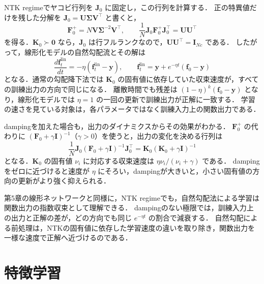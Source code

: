 \documentclass[../main.tex]{subfiles}
\begin{document}
NTK regimeでヤコビ行列を $\bm{J}_0$ に固定し，この行列を計算する．
正の特異値だけを残した分解を $\bm{J}_0=\bm{U}\bm{\Sigma}\bm{V}^\top$ と書くと，
\begin{equation}
  \bm{F}_0^+=N\bm{V}\bm{\Sigma}^{-2}\bm{V}^\top,
  \qquad
  \frac1N\bm{J}_0\bm{F}_0^+\bm{J}_0^\top
  =\bm{U}\bm{U}^\top
  \label{eq:ntk-natural-projection}
\end{equation}
を得る．$\bm{K}_0\succ\bm{0}$ なら，$\bm{J}_0$ は行フルランクなので，$\bm{U}\bm{U}^\top=\bm{I}_{Nc}$ である．
したがって，線形化モデルの自然勾配流とその解は
\begin{equation}
  \frac{d\bm{f}^{\mathrm{lin}}_t}{dt}
  =-\eta(\bm{f}^{\mathrm{lin}}_t-\bm{y}),
  \qquad
  \bm{f}^{\mathrm{lin}}_t
  =\bm{y}+e^{-\eta t}(\bm{f}_0-\bm{y})
  \label{eq:ntk-natural-solution}
\end{equation}
となる\cite{karakida2020natural}．通常の勾配降下法では $\bm{K}_0$ の固有値に依存していた収束速度が，すべての訓練出力の方向で同じになる．
離散時間でも残差は $(1-\eta)^k(\bm{f}_0-\bm{y})$ となり，線形化モデルでは $\eta=1$ の一回の更新で訓練出力が正解に一致する．
学習の速さを見ている対象は，各パラメータではなく訓練入力上の関数出力である．

dampingを加えた場合も，出力のダイナミクスからその効果がわかる．
$\bm{F}_0^+$ の代わりに $(\bm{F}_0+\gamma\bm{I})^{-1}$（$\gamma>0$）を使うと，出力の変化を決める行列は
\begin{equation}
  \frac1N\bm{J}_0(\bm{F}_0+\gamma\bm{I})^{-1}\bm{J}_0^\top
  =\bm{K}_0(\bm{K}_0+\gamma\bm{I})^{-1}
  \label{eq:ntk-damped-kernel}
\end{equation}
となる．$\bm{K}_0$ の固有値 $\nu_i$ に対応する収束速度は $\eta\nu_i/(\nu_i+\gamma)$ である．
dampingをゼロに近づけると速度が $\eta$ にそろい，dampingが大きいと，小さい固有値の方向の更新がより強く抑えられる．

第5章の線形ネットワークと同様に，NTK regimeでも，自然勾配法による学習は関数出力の指数収束として理解できる．
dampingのない極限では，訓練入力上の出力と正解の差が，どの方向でも同じ $e^{-\eta t}$ の割合で減衰する．
自然勾配による前処理は，NTKの固有値に依存した学習速度の違いを取り除き，関数出力を一様な速度で正解へ近づけるのである．

\section{特徴学習}


\chapterbibliography
\end{document}
